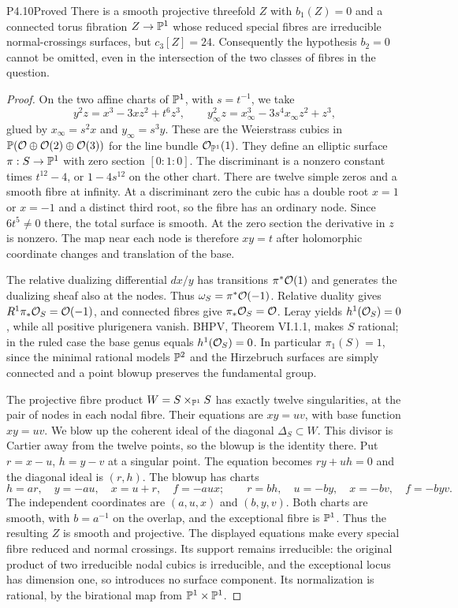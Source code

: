 \begin{statement}{P4.10}{Proved}
There is a smooth projective threefold $Z$ with $b_1(Z)=0$ and a
connected torus fibration $Z\to\mathbb P^1$ whose reduced special fibres
are irreducible normal-crossings surfaces, but $c_3[Z]=24$.
Consequently the hypothesis $b_2=0$ cannot be omitted, even in the
intersection of the two classes of fibres in the question.
\end{statement}
\begin{proof}
On the two affine charts of $\mathbb P^1$, with $s=t^{-1}$, we take
\[
 y^2z=x^3-3xz^2+t^6z^3,\qquad
 y_\infty^2z=x_\infty^3-3s^4x_\infty z^2+z^3,
\]
glued by $x_\infty=s^2x$ and $y_\infty=s^3y$. These are the
Weierstrass cubics in $\mathbb P(\mathcal O\oplus\mathcal O(2)\oplus\mathcal O(3))$ for
the line bundle $\mathcal O_{\mathbb P^1}(1)$. They define an elliptic surface
$\pi:S\to\mathbb P^1$ with zero section $[0:1:0]$. The discriminant
is a nonzero constant times $t^{12}-4$, or $1-4s^{12}$ on the
other chart. There are twelve simple zeros and a smooth fibre at
infinity. At a discriminant zero the cubic has a double root
$x=1$ or $x=-1$ and a distinct third root, so the fibre has an
ordinary node. Since $6t^5\ne0$ there, the total surface is smooth.
At the zero section the derivative in $z$ is nonzero. The map near
each node is therefore $xy=t$ after holomorphic coordinate changes
and translation of the base.

The relative dualizing differential $dx/y$ has transitions
$\pi^*\mathcal O(1)$ and generates the dualizing sheaf also at the nodes.
Thus $\omega_S=\pi^*\mathcal O(-1)$. Relative duality gives
$R^1\pi_*\mathcal O_S=\mathcal O(-1)$, and connected fibres give
$\pi_*\mathcal O_S=\mathcal O$. Leray yields $h^1(\mathcal O_S)=0$, while all
positive plurigenera vanish. BHPV, Theorem VI.1.1, makes $S$
rational; in the ruled case the base genus equals $h^1(\mathcal O_S)=0$.
In particular $\pi_1(S)=1$, since the minimal rational models
$\mathbb P^2$ and the Hirzebruch surfaces are simply connected and a
point blowup preserves the fundamental group.

The projective fibre product $W=S\times_{\mathbb P^1}S$ has exactly
twelve singularities, at the pair of nodes in each nodal fibre.
Their equations are $xy=uv$, with base function $xy=uv$. We blow
up the coherent ideal of the diagonal $\Delta_S\subset W$. This
divisor is Cartier away from the twelve points, so the blowup is
the identity there. Put $r=x-u$, $h=y-v$ at a singular point.
The equation becomes $ry+uh=0$ and the diagonal ideal is $(r,h)$.
The blowup has charts
\[
 h=ar,\quad y=-au,\quad x=u+r,\quad f=-aux;
 \qquad
 r=bh,\quad u=-by,\quad x=-bv,\quad f=-byv.
\]
The independent coordinates are $(a,u,x)$ and $(b,y,v)$.
Both charts are smooth, with $b=a^{-1}$ on the overlap, and the
exceptional fibre is $\mathbb P^1$. Thus the resulting $Z$ is smooth
and projective. The displayed equations make every special fibre
reduced and normal crossings. Its support remains irreducible:
the original product of two irreducible nodal cubics is irreducible,
and the exceptional locus has dimension one, so introduces no
surface component. Its normalization is rational, by the
birational map from $\mathbb P^1\times\mathbb P^1$.


\end{proof}
